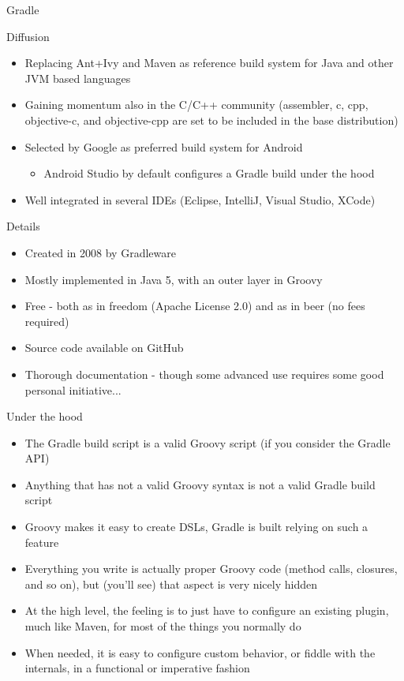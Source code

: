 \documentclass[presentation]{beamer}
\begin{document}
\begin{frame}{Gradle}
\begin{block}{Diffusion}
\begin{itemize}
			\item Replacing Ant+Ivy and Maven as reference build system for Java and other JVM based languages
			\item Gaining momentum also in the C/C++ community (assembler, c, cpp, objective-c, and objective-cpp are set to be included in the base distribution)
			\item Selected by Google as preferred build system for Android
			\begin{itemize}
				\item Android Studio by default configures a Gradle build under the hood
			\end{itemize}
			\item Well integrated in several IDEs (Eclipse, IntelliJ, Visual Studio, XCode)
		\end{itemize}
	\end{block}
	\begin{block}{Details}
		\begin{itemize}
			\item Created in 2008 by Gradleware
			\item Mostly implemented in Java 5, with an outer layer in Groovy
			\item Free - both as in freedom (Apache License 2.0) and as in beer (no fees required)
			\item Source code available on GitHub
			\item Thorough documentation - though some advanced use requires some good personal initiative...
		\end{itemize}
	\end{block}
\end{frame}

\begin{frame}[fragile]{Under the hood}
	\begin{itemize}
		\item The Gradle build script is a valid Groovy script (if you consider the Gradle API)
		\item Anything that has not a valid Groovy syntax is not a valid Gradle build script
		\item Groovy makes it easy to create DSLs, Gradle is built relying on such a feature
		\item Everything you write is actually proper Groovy code (method calls, closures, and so on), but (you'll see) that aspect is very nicely hidden
		\item At the high level, the feeling is to just have to configure an existing plugin, much like Maven, for most of the things you normally do
		\item When needed, it is easy to configure custom behavior, or fiddle with the internals, in a functional or imperative fashion
	\end{itemize}
\end{frame}
\end{document}
